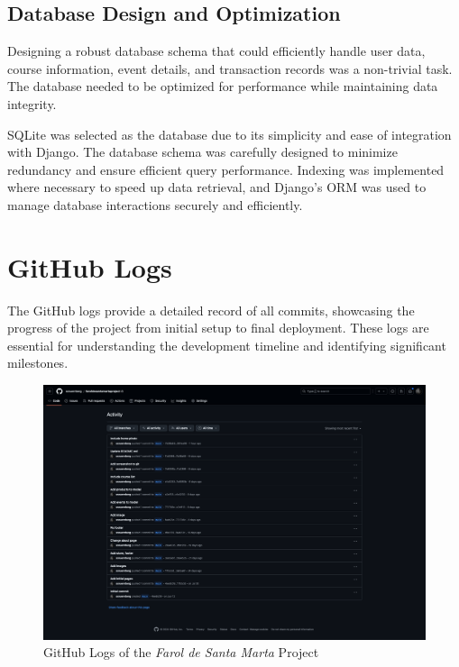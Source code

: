 \subsection{Database Design and Optimization}

Designing a robust database schema that could efficiently handle user data, course information, event details, and transaction records was a non-trivial task. The database needed to be optimized for performance while maintaining data integrity.

SQLite was selected as the database due to its simplicity and ease of integration with Django. The database schema was carefully designed to minimize redundancy and ensure efficient query performance. Indexing was implemented where necessary to speed up data retrieval, and Django’s ORM was used to manage database interactions securely and efficiently.

\section{GitHub Logs}

The GitHub logs provide a detailed record of all commits, showcasing the progress of the project from initial setup to final deployment. These logs are essential for understanding the development timeline and identifying significant milestones.

\begin{figure}[H]
    \centering
    \includegraphics[width=\textwidth]{images/github-log.png}
    \caption{GitHub Logs of the \textit{Farol de Santa Marta} Project}
    \label{fig:github_logs}
\end{figure}

